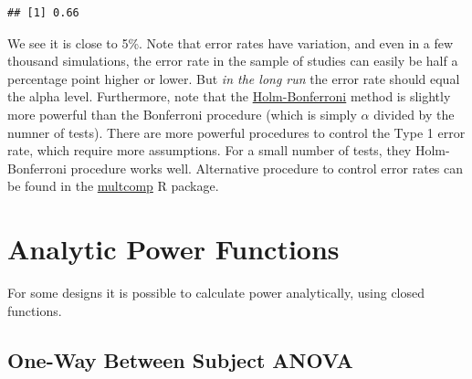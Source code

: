 \documentclass[]{book}
\begin{document}
\begin{verbatim}
## [1] 0.66
\end{verbatim}

We see it is close to 5\%. Note that error rates have variation, and even in a few thousand simulations, the error rate in the sample of studies can easily be half a percentage point higher or lower. But \emph{in the long run} the error rate should equal the alpha level. Furthermore, note that the \href{https://en.wikipedia.org/wiki/Holm\%E2\%80\%93Bonferroni_method}{Holm-Bonferroni} method is slightly more powerful than the Bonferroni procedure (which is simply \(\alpha\) divided by the numner of tests). There are more powerful procedures to control the Type 1 error rate, which require more assumptions. For a small number of tests, they Holm-Bonferroni procedure works well. Alternative procedure to control error rates can be found in the \href{https://cran.r-project.org/web/packages/multcomp/index.html}{multcomp} R package.

\hypertarget{analytic-power-functions}{%
\chapter{Analytic Power Functions}\label{analytic-power-functions}}

For some designs it is possible to calculate power analytically, using closed functions.

\hypertarget{one-way-between-subject-anova}{%
\section{One-Way Between Subject ANOVA}\label{one-way-between-subject-anova}}
\end{document}
